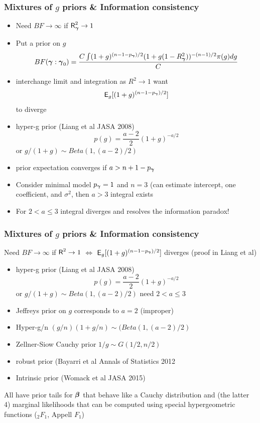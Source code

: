 \documentclass[]{beamer}
\begin{document}
\begin{frame}
  \frametitle{Mixtures of $g$ priors \& Information consistency}


\begin{itemize}
\item Need $BF \to \infty$ if $\textsf{R}_{\boldsymbol{\gamma}}^2 \to 1$
\item Put a prior on $g$
$$BF(\boldsymbol{\gamma} : \boldsymbol{\gamma}_0) =  \frac{ C \int (1 + g)^{(n - 1 - p_{\boldsymbol{\gamma}})/2} (1 + g(1 - R_{\boldsymbol{\gamma}}^2))^{-(n-1)/2} \pi(g) dg}{C}$$
\item interchange limit and integration as $R^2 \to 1$
want
$$ \textsf{E}_g[(1 +
g)^{(n-1-p_{\boldsymbol{\gamma}})/2}]$$  to diverge

\item hyper-g prior (Liang et al JASA 2008)
$$p(g) = \frac{a-2}{2}(1 + g)^{-a/2}$$ or $g/(1+g) \sim Beta(1, (a-2)/2)$

\item prior expectation converges if $a > n + 1 - p_{\boldsymbol{\gamma}}$

\item Consider minimal model $p_{\boldsymbol{\gamma}} = 1$ and $n = 3$ (can estimate intercept, one coefficient, and  $\sigma^2$, then $a > 3$ integral exists

\item For $2 < a \le 3$ integral diverges and resolves the information paradox!
\end{itemize}

\end{frame}

\begin{frame}
  \frametitle{Mixtures of $g$ priors \& Information consistency}

Need $BF \to \infty$ if $\textsf{R}^2 \to 1$  $\Leftrightarrow$ $\textsf{E}_g[(1 +
g)^{(n-1-p_{\boldsymbol{\gamma}})/2}]$ diverges  (proof in Liang et al)
\pause
\begin{itemize}

\item hyper-g prior (Liang et al JASA 2008)
$$p(g) = \frac{a-2}{2}(1 + g)^{-a/2}$$ or $g/(1+g) \sim Beta(1, (a-2)/2)$
need $2 < a \le 3$
\pause
\item Jeffreys prior on $g$ corresponds to $a = 2$ (improper) \pause
\item Hyper-g/n  $(g/n)(1 + g/n) \sim (Beta(1, (a-2)/2)$ \pause
\item Zellner-Siow Cauchy prior $1/g \sim G(1/2, n/2)$ \pause
\item robust prior (Bayarri et al Annals of Statistics 2012 \pause
\item Intrinsic prior (Womack et al  JASA 2015)
\end{itemize}

 All have prior tails for $\boldsymbol{\beta}$  that behave like a Cauchy distribution
 and (the latter 4) marginal  likelihoods that can be computed using special hypergeometric
 functions   ($_2F_1$, Appell $F_1$)
\end{frame}
\end{document}
